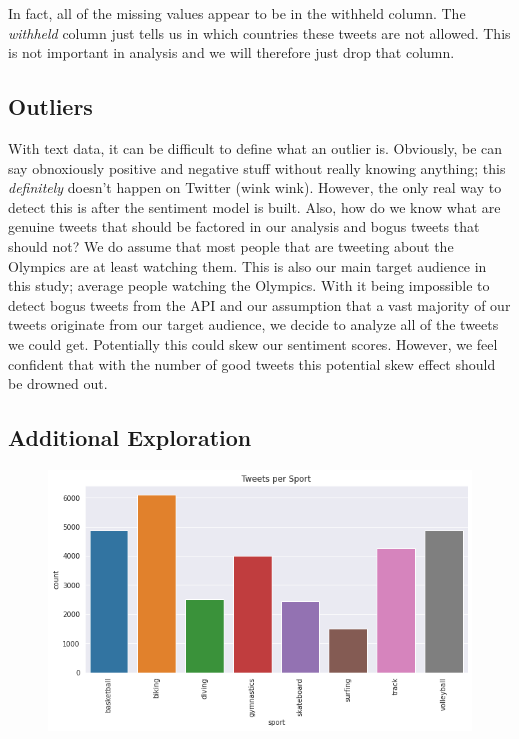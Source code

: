 \documentclass[12pt]{article}
\begin{document}
            In fact, all of the missing values appear to be in the withheld column. The \textit{withheld} column just tells us in which countries these tweets are not allowed. This is not
            important in analysis and we will therefore just drop that column. 
        \subsection{Outliers}
            With text data, it can be difficult to define what an outlier is. Obviously, be can say obnoxiously positive and negative stuff without really knowing anything; this
            \textit{definitely} doesn't happen on Twitter (wink wink). However, the only real way to detect this is after the sentiment model is built. Also, how do we know what are
            genuine tweets that should be factored in our analysis and bogus tweets that should not? We do assume that most people that are tweeting about the Olympics are at least
            watching them. This is also our main target audience in this study; average people watching the Olympics. With it being impossible to detect bogus tweets from the API and
            our assumption that a vast majority of our tweets originate from our target audience, we decide to analyze all of the tweets we could get. Potentially this could skew our
            sentiment scores. However, we feel confident that with the number of good tweets this potential skew effect should be drowned out.
        \subsection{Additional Exploration}

            \begin{figure}
                \centering
                \includegraphics[scale=0.5]{sporttweet.png}
            \end{figure}
\end{document}
